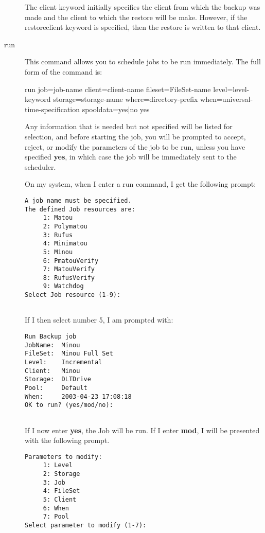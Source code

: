 \begin{description}
   The client keyword initially specifies the client from which the backup
   was made and the client to which the restore will be make.  However,
   if the restoreclient keyword is specified, then the restore is written
   to that client.

\item [run]
   This command allows you to schedule jobs  to be run immediately. The full form
   of the command is:

run job=\lt{}job-name\gt{} client=\lt{}client-name\gt{}
  fileset=\lt{}FileSet-name\gt{}  level=\lt{}level-keyword\gt{}
  storage=\lt{}storage-name\gt{}  where=\lt{}directory-prefix\gt{}
  when=\lt{}universal-time-specification\gt{} spooldata=yes|no yes

   Any information that is needed but not specified will be listed for
   selection, and before starting the job, you will be prompted to accept,
   reject, or modify the parameters of the job to be run, unless you have
   specified {\bf yes}, in which case the job will be immediately sent to
   the scheduler.

   On my system, when I enter a run command, I get the following  prompt:  

\footnotesize
\begin{verbatim}
A job name must be specified.
The defined Job resources are:
     1: Matou
     2: Polymatou
     3: Rufus
     4: Minimatou
     5: Minou
     6: PmatouVerify
     7: MatouVerify
     8: RufusVerify
     9: Watchdog
Select Job resource (1-9):
     
\end{verbatim}
\normalsize

If I then select number 5, I am prompted with:  

\footnotesize
\begin{verbatim}
Run Backup job
JobName:  Minou
FileSet:  Minou Full Set
Level:    Incremental
Client:   Minou
Storage:  DLTDrive
Pool:     Default
When:     2003-04-23 17:08:18
OK to run? (yes/mod/no):
     
\end{verbatim}
\normalsize

If I now enter {\bf yes}, the Job will be run. If I enter {\bf mod},  I will
be presented with the following prompt.  

\footnotesize
\begin{verbatim}
Parameters to modify:
     1: Level
     2: Storage
     3: Job
     4: FileSet
     5: Client
     6: When
     7: Pool
Select parameter to modify (1-7):
     

\end{verbatim}
\end{description}
